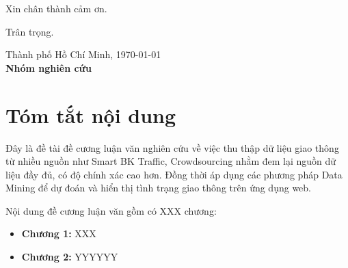 \documentclass[
11pt, %
vietnam, %
singlespacing, %
parskip, %
headsepline, %
]{MastersDoctoralThesis} %
\begin{document}
Xin chân thành cảm ơn.

Trân trọng.\\[1cm]

\begin{minipage}[t]{0.4\textwidth}
\hspace*{1cm}
\end{minipage}
\begin{minipage}[t]{0.6\textwidth}
\begin{center}
Thành phố Hồ Chí Minh, \today\\
\textbf{Nhóm nghiên cứu}
\end{center}
\end{minipage}


\chapter{Tóm tắt nội dung}
Đây là đề tài đề cương luận văn nghiên cứu về việc thu thập dữ liệu giao thông từ nhiều nguồn như Smart BK Traffic, Crowdsourcing nhằm đem lại nguồn dữ liệu đầy đủ, có độ chính xác cao hơn. Đồng thời áp dụng các phương pháp Data Mining để dự đoán và hiển thị tình trạng giao thông trên ứng dụng web.

Nội dung đề cương luận văn gồm có XXX chương:
\begin{itemize}
\item \textbf{Chương 1:} XXX
\item \textbf{Chương 2:} YYYYYY
\end{itemize}



{
\hypersetup{linkcolor=black}
\tableofcontents %

\listoffigures %

\listoftables %
}
\end{document}
